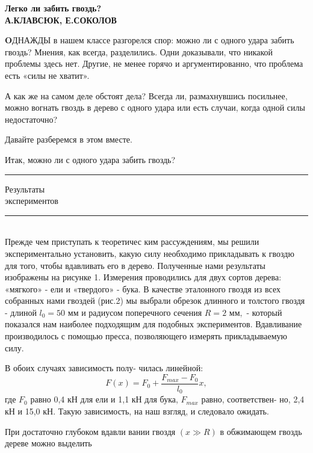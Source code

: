 

\fontsize{9}{12pt}\selectfont 

\vspace{-17pt}
\begin{center}
\textbf{\LARGE{Легко ли забить гвоздь?}} \\
\vskip 30pt
\textsf{\textbf{\large{А.КЛАВСЮК, Е.СОКОЛОВ}}}
    
\end{center}
\vspace{5pt}
\setlength{\columnsep}{20pt} 
\begin{multicols}{3}

\lettrine[lraise=0.2, nindent=1pt, lines=3]{\textbf{O}}{ДНАЖДЫ} в нашем классе разгорелся спор: можно ли с одного удара забить гвоздь? Мнения, как всегда, разделились. Одни доказывали, что никакой проблемы здесь нет. Другие, не менее горячо и аргументированно, что проблема есть
«силы не хватит». \par
А как же на самом деле обстоят дела? Всегда ли, размахнувшись посильнее, можно вогнать гвоздь в дерево с одного удара или есть случаи, когда одной силы недостаточно?

Давайте разберемся в этом вместе.

Итак, можно ли с одного удара забить гвоздь?\vskip 5mm

\noindent\rule{1\linewidth}{1pt} 
\textsf{{\Large{Результаты
\vspace{3pt}\\
экспериментов}}} 
\vspace{-5pt}\\
\noindent\rule{1\linewidth}{1pt} \\    
Прежде чем приступать к теоретичес ким рассуждениям, мы решили экспериментально установить, какую силу необходимо прикладывать к гвоздю для того, чтобы вдавливать его в дерево. Полученные нами результаты изображены на рисунке 1. Измерения проводились для двух сортов дерева: «мягкого» - ели и «твердого» - бука. В качестве эталонного гвоздя из всех собранных нами гвоздей (рис.2) мы выбрали обрезок длинного и толстого гвоздя -
длиной $l_0 = 50 \text{ мм}$ и радиусом поперечного сечения $R = 2 \text{ мм},$ -
который показался нам наиболее подходящим для подобных экспериментов. Вдавливание производилось с помощью пресса, позволяющего измерять прикладываемую силу.

В обоих случаях зависимость полу- чилась линейной:
$$ F(x) = F_0 + \frac{F_{max} - F_0}{l_0}x,$$
где $F_0$ равно 0,4 кН для ели и 1,1 кН для бука, $F_{max}$ равно, соответствен- но, 2,4 кН и 15,0 кН. Такую зависимость, на наш взгляд, и следовало ожидать.

При достаточно глубоком вдавли вании гвоздя $(x \gg R)$ в обжимающем гвоздь дереве можно выделить

\end{multicols}

